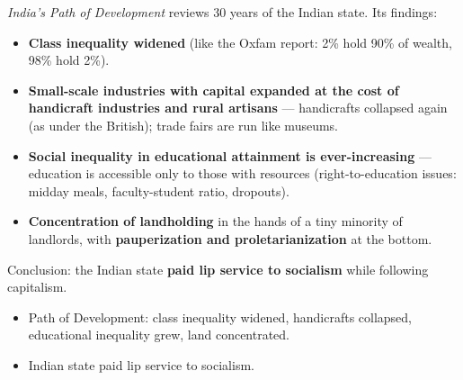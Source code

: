 \emph{India's Path of Development} reviews 30 years of the Indian state. Its findings:
\begin{itemize}
\item \textbf{Class inequality widened} (like the Oxfam report: 2\% hold 90\% of wealth, 98\% hold 2\%).
\item \textbf{Small-scale industries with capital expanded at the cost of handicraft industries and rural artisans} --- handicrafts collapsed again (as under the British); trade fairs are run like museums.
\item \textbf{Social inequality in educational attainment is ever-increasing} --- education is accessible only to those with resources (right-to-education issues: midday meals, faculty-student ratio, dropouts).
\item \textbf{Concentration of landholding} in the hands of a tiny minority of landlords, with \textbf{pauperization and proletarianization} at the bottom.
\end{itemize}

\begin{CriticalPoint}
Conclusion: the Indian state \textbf{paid lip service to socialism} while following capitalism.
\end{CriticalPoint}

\begin{QuickRevision}
\begin{itemize}
\item Path of Development: class inequality widened, handicrafts collapsed, educational inequality grew, land concentrated.
\item Indian state paid lip service to socialism.
\end{itemize}
\end{QuickRevision}
